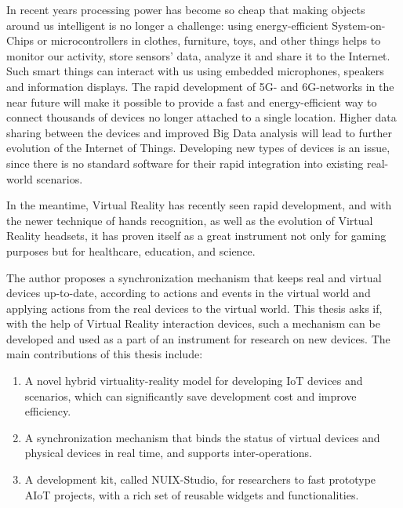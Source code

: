 \begin{abstract*}

  In recent years processing power has become so cheap that making objects around us intelligent is no longer a challenge: using energy-efficient System-on-Chips or microcontrollers in clothes, furniture, toys, and other things helps to monitor our activity, store sensors' data, analyze it and share it to the Internet. Such smart things can interact with us using embedded microphones, speakers and information displays. The rapid development of 5G- and 6G-networks in the near future will make it possible to provide a fast and energy-efficient way to connect thousands of devices no longer attached to a single location. Higher data sharing between the devices and improved Big Data analysis will lead to further evolution of the Internet of Things. Developing new types of devices is an issue, since there is no standard software for their rapid integration into existing real-world scenarios.
   
  In the meantime, Virtual Reality has recently seen rapid development, and with the newer technique of hands recognition, as well as the evolution of Virtual Reality headsets, it has proven itself as a great instrument not only for gaming purposes but for healthcare, education, and science.
   
  The author proposes a synchronization mechanism that keeps real and virtual devices up-to-date, according to actions and events in the virtual world and applying actions from the real devices to the virtual world. This thesis asks if, with the help of Virtual Reality interaction devices, such a mechanism can be developed and used as a part of an instrument for research on new devices. The main contributions of this thesis include:
  
  \begin{enumerate}
      \item A novel hybrid virtuality-reality model for developing IoT devices and scenarios, which can significantly save development cost and improve efficiency. 
      \item A synchronization mechanism that binds the status of virtual devices and physical devices in real time, and supports inter-operations. 
      \item A development kit, called NUIX-Studio, for researchers to fast prototype AIoT projects, with a rich set of reusable widgets and functionalities.
  \end{enumerate}
  
\end{abstract*}
